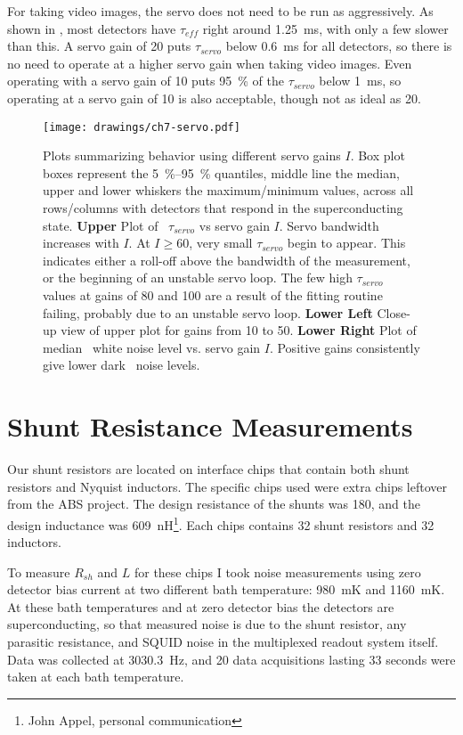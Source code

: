 For taking video images, the servo does not need to be run as aggressively.
As shown in , most detectors have $\tau_{eff}$ right around \SI{1.25}{\ms}, with only a few slower than this.
A servo gain of 20 puts $\tau_{servo}$ below \SI{0.6}{\ms} for all detectors, so there is no need to operate at a higher servo gain when taking video images.
Even operating with a servo gain of 10 puts \SI{95}{\percent} of the $\tau_{servo}$ below \SI{1}{\ms}, so operating at a servo gain of 10 is also acceptable, though not as ideal as 20.

\begin{figure*}
\texttt{[image: drawings/ch7-servo.pdf]}
\caption{Plots summarizing behavior using different servo gains $I$.
  Box plot boxes represent the \SIrange{5}{95}{\percent} quantiles, middle line the median, upper and lower whiskers the maximum/minimum values, across all rows/columns with detectors that respond in the superconducting state.
\textbf{Upper} Plot of \SQUID\ $\tau_{servo}$ vs servo gain $I$.
Servo bandwidth increases with $I$.
At $I \ge \num{60}$, very small $\tau_{servo}$ begin to appear. This indicates either a roll-off above the bandwidth of the measurement, or the beginning of an unstable servo loop.
The few high $\tau_{servo}$ values at gains of 80 and 100 are a result of the fitting routine failing, probably due to an unstable servo loop.
\textbf{Lower Left} Close-up view of upper plot for gains from 10 to 50.
\textbf{Lower Right} Plot of median \SQUID\ white noise level vs. servo gain $I$. Positive gains consistently give lower dark \SQUID\ noise levels.
}
\label{fig:ch7-servo}
\end{figure*}

\section{Shunt Resistance Measurements}\label{sec:shunt-nyquist}

Our shunt resistors are located on interface chips that contain both shunt resistors and Nyquist inductors.
The specific chips used were extra chips leftover from the ABS\cite{kusaka_modulation_2013} project.
The design resistance of the shunts was \SI{180}{\uohm}, and the design inductance was 609~nH\footnote{John Appel, personal communication}.
Each chips contains 32 shunt resistors and 32 inductors.

To measure $R_{sh}$ and $L$ for these chips I took noise measurements using zero detector bias current at two different bath temperature: 980~mK and 1160~mK.
At these bath temperatures and at zero detector bias the detectors are superconducting, so that measured noise is due to the shunt resistor, any parasitic resistance, and SQUID noise in the multiplexed readout system itself.
Data was collected at 3030.3~Hz, and 20 data acquisitions lasting 33 seconds were taken at each bath temperature.

